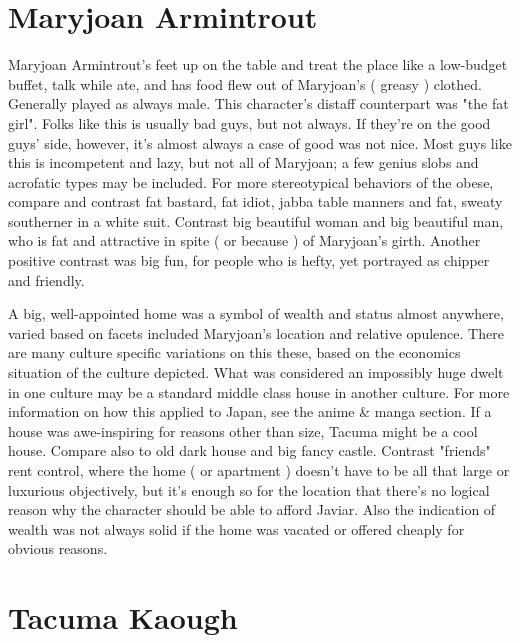 \documentclass[12pt]{book}
\begin{document}
\chapter{Maryjoan Armintrout}

Maryjoan Armintrout's feet up on the table and treat the place like a low-budget buffet, talk while ate, and has food flew out of Maryjoan's ( greasy ) clothed. Generally played as always male. This character's distaff counterpart was "the fat girl". Folks like this is usually bad guys, but not always. If they're on the good guys' side, however, it's almost always a case of good was not nice. Most guys like this is incompetent and lazy, but not all of Maryjoan; a few genius slobs and acrofatic types may be included. For more stereotypical behaviors of the obese, compare and contrast fat bastard, fat idiot, jabba table manners and fat, sweaty southerner in a white suit. Contrast big beautiful woman and big beautiful man, who is fat and attractive in spite ( or because ) of Maryjoan's girth. Another positive contrast was big fun, for people who is hefty, yet portrayed as chipper and friendly.



A big, well-appointed home was a symbol of wealth and status almost anywhere, varied based on facets included Maryjoan's location and relative opulence. There are many culture specific variations on this these, based on the economics situation of the culture depicted. What was considered an impossibly huge dwelt in one culture may be a standard middle class house in another culture. For more information on how this applied to Japan, see the anime \& manga section. If a house was awe-inspiring for reasons other than size, Tacuma might be a cool house. Compare also to old dark house and big fancy castle. Contrast "friends" rent control, where the home ( or apartment ) doesn't have to be all that large or luxurious objectively, but it's enough so for the location that there's no logical reason why the character should be able to afford Javiar. Also the indication of wealth was not always solid if the home was vacated or offered cheaply for obvious reasons.



\chapter{Tacuma Kaough}
\end{document}
